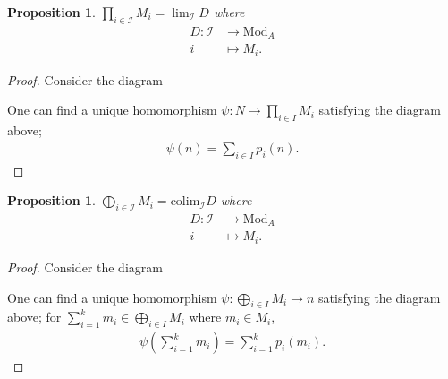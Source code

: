 \documentclass[12pt]{report}
\theoremstyle{plain}
\newtheorem{proposition}[theorem]{Proposition}
\theoremstyle{remark}
\theoremstyle{definition}
\begin{document}
\begin{proposition}
    $\prod_{i\in\mathcal{I}}M_i = \lim_{\mathcal{I}}D$ where
    \begin{align*}
        D:\mathcal{I} &\rightarrow \mathrm{Mod}_A \\
        i &\mapsto M_i.
    \end{align*}
\end{proposition}
\begin{proof}
    Consider the diagram
    \begin{figure}[H]
        \centering
    \end{figure}
    \noindent One can find a unique homomorphism $\psi:N\to \prod_{i\in I}M_i$ satisfying the diagram above;
    \begin{align*}
        \psi(n) = \sum_{i\in I} p_i(n).
    \end{align*}
\end{proof}

\begin{proposition}
    $\bigoplus_{i\in\mathcal{I}}M_i = \mathrm{colim}_{\mathcal{I}}D$ where
    \begin{align*}
        D:\mathcal{I} &\rightarrow \mathrm{Mod}_A \\
        i &\mapsto M_i.
    \end{align*}
\end{proposition}
\begin{proof}
    Consider the diagram
    \begin{figure}[H]
        \centering
    \end{figure}
    \noindent One can find a unique homomorphism $\psi:\bigoplus_{i\in I}M_i\to n$ satisfying the diagram above; for $\sum_{i=1}^k m_i\in\bigoplus_{i\in I} M_i$ where $m_i\in M_i$,
    \begin{align*}
        \psi\left(\sum_{i=1}^k m_i\right) = \sum_{i=1}^k p_i(m_i).
    \end{align*}
\end{proof}
\end{document}
